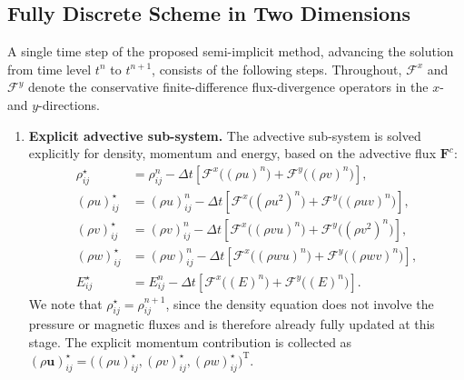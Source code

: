\documentclass[a4paper,fleqn]{cas-sc}
\theoremstyle{definition}
\theoremstyle{remark}
\begin{document}
\subsection{Fully Discrete Scheme in Two Dimensions}
\label{sec:fully_discrete}
A single time step of the proposed semi-implicit method, advancing the solution
from time level $t^n$ to $t^{n+1}$, consists of the following steps. Throughout,
$\mathcal{F}^{x}$ and $\mathcal{F}^{y}$ denote the conservative finite-difference
flux-divergence operators in the $x$- and $y$-directions.

\begin{enumerate}

\item \textbf{Explicit advective sub-system.}
The advective sub-system is solved explicitly for density, momentum and energy,
based on the advective flux $\mathbf{F}^{c}$:
\begin{equation}
\begin{aligned}
\rho_{ij}^{\star}
&= \rho_{ij}^{n}
 - \Delta t\left[\mathcal{F}^{x}\!\big((\rho u)^{n}\big)
 + \mathcal{F}^{y}\!\big((\rho v)^{n}\big)\right],\\
(\rho u)_{ij}^{\star}
&= (\rho u)_{ij}^{n}
 - \Delta t\left[\mathcal{F}^{x}\!\big((\rho u^{2})^{n}\big)
 + \mathcal{F}^{y}\!\big((\rho u v)^{n}\big)\right],\\
(\rho v)_{ij}^{\star}
&= (\rho v)_{ij}^{n}
 - \Delta t\left[\mathcal{F}^{x}\!\big((\rho v u)^{n}\big)
 + \mathcal{F}^{y}\!\big((\rho v^{2})^{n}\big)\right],\\
(\rho w)_{ij}^{\star}
&= (\rho w)_{ij}^{n}
 - \Delta t\left[\mathcal{F}^{x}\!\big((\rho w u)^{n}\big)
 + \mathcal{F}^{y}\!\big((\rho w v)^{n}\big)\right],\\
E_{ij}^{\star}
&= E_{ij}^{n}
 - \Delta t\left[\mathcal{F}^{x}\!\big((E)^{n}\big)
 + \mathcal{F}^{y}\!\big((E)^{n}\big)\right].
\end{aligned}
\end{equation}
We note that $\rho_{ij}^{\star}=\rho_{ij}^{n+1}$, since the density equation does
not involve the pressure or magnetic fluxes and is therefore already fully updated
at this stage. The explicit momentum contribution is collected as
$(\rho\mathbf{u})_{ij}^{\star}=\big((\rho u)_{ij}^{\star},(\rho v)_{ij}^{\star},
(\rho w)_{ij}^{\star}\big)^{\mathrm{T}}$.


\end{enumerate}
\end{document}
